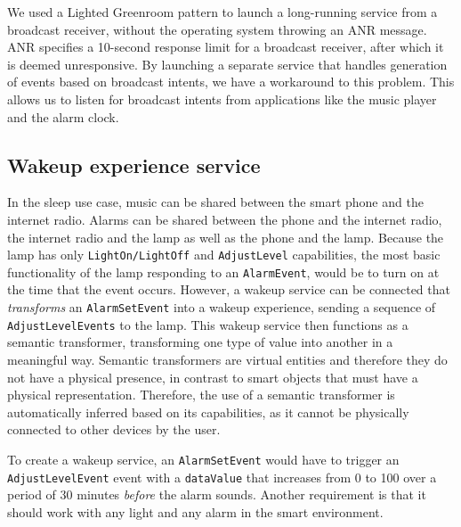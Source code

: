 We used a Lighted Greenroom \cite{Komatineni2011} pattern to launch a long-running service from a broadcast receiver, without the operating system throwing an \ac{ANR} message. \ac{ANR} specifies a 10-second response limit for a broadcast receiver, after which it is deemed unresponsive. By launching a separate service that handles generation of events based on broadcast intents, we have a workaround to this problem. This allows us to listen for broadcast intents from applications like the music player and the alarm clock.

\subsection{Wakeup experience service}

In the sleep use case, music can be shared between the smart phone and the internet radio. Alarms can be shared between the phone and the internet radio, the internet radio and the lamp as well as the phone and the lamp. Because the lamp has only \texttt{LightOn/LightOff} and \texttt{AdjustLevel} capabilities, the most basic functionality of the lamp responding to an \texttt{AlarmEvent}, would be to turn on at the time that the event occurs. However, a wakeup service can be connected that \emph{transforms} an \texttt{AlarmSetEvent} into a wakeup experience, sending a sequence of \texttt{AdjustLevelEvents} to the lamp. This wakeup service then functions as a semantic transformer, transforming one type of value into another in a meaningful way. Semantic transformers are virtual entities and therefore they do not have a physical presence, in contrast to smart objects that must have a physical representation. Therefore, the use of a semantic transformer is automatically inferred based on its capabilities, as it cannot be physically connected to other devices by the user. 

To create a wakeup service, an \texttt{AlarmSetEvent} would have to trigger an \texttt{AdjustLevelEvent} event with a \texttt{dataValue} that increases from 0 to 100 over a period of 30 minutes \emph{before} the alarm sounds. Another requirement is that it should work with any light and any alarm in the smart environment. 


